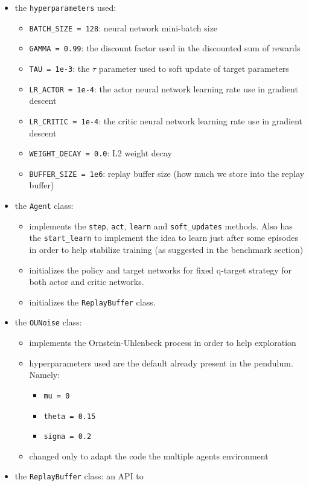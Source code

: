 \documentclass[
]{article}
\providecommand{\tightlist}{%
  \setlength{\itemsep}{0pt}\setlength{\parskip}{0pt}}
\begin{document}
\begin{itemize}
\tightlist
\item
  the \texttt{hyperparameters} used:

  \begin{itemize}
  \tightlist
  \item
    \texttt{BATCH\_SIZE\ =\ 128}: neural network mini-batch size
  \item
    \texttt{GAMMA\ =\ 0.99}: the discount factor used in the discounted
    sum of rewards
  \item
    \texttt{TAU\ =\ 1e-3}: the \(\tau\) parameter used to soft update of
    target parameters
  \item
    \texttt{LR\_ACTOR\ =\ 1e-4}: the actor neural network learning rate
    use in gradient descent
  \item
    \texttt{LR\_CRITIC\ =\ 1e-4}: the critic neural network learning
    rate use in gradient descent
  \item
    \texttt{WEIGHT\_DECAY\ =\ 0.0}: L2 weight decay
  \item
    \texttt{BUFFER\_SIZE\ =\ 1e6}: replay buffer size (how much we store
    into the replay buffer)
  \end{itemize}
\item
  the \texttt{Agent} class:

  \begin{itemize}
  \tightlist
  \item
    implements the \texttt{step}, \texttt{act}, \texttt{learn} and
    \texttt{soft\_updates} methods. Also has the \texttt{start\_learn}
    to implement the idea to learn just after some episodes in order to
    help stabilize training (as suggested in the benchmark section)
  \item
    initializes the policy and target networks for fixed q-target
    strategy for both actor and critic networks.
  \item
    initializes the \texttt{ReplayBuffer} class.
  \end{itemize}
\item
  the \texttt{OUNoise} class:

  \begin{itemize}
  \tightlist
  \item
    implements the Ornstein-Uhlenbeck process in order to help
    exploration
  \item
    hyperparameters used are the default already present in the
    pendulum. Namely:

    \begin{itemize}
    \tightlist
    \item
      \texttt{mu\ =\ 0}
    \item
      \texttt{theta\ =\ 0.15}
    \item
      \texttt{sigma\ =\ 0.2}
    \end{itemize}
  \item
    changed only to adapt the code the multiple agents environment
  \end{itemize}
\item
  the \texttt{ReplayBuffer} class: an API to


\end{itemize}
\end{document}
